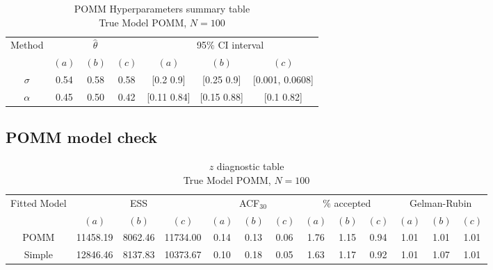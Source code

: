 \documentclass[11pt]{amsart}
\begin{document}
\begin{table}[htbp]
\centering
\caption*{
{\large POMM Hyperparameters summary table} \\ 
{\small True Model POMM, $N=100$}
} 
\begin{tabular}{ccccccc}
\toprule
\multirow{2}{*}{Method} & \multicolumn{3}{c}{
$\hat{\theta}$} & \multicolumn{3}{c}{
95$\%$ CI interval}  \\
\cmidrule(lr){2-4} \cmidrule(lr){5-7} 
& $(a)$ & $(b)$ & $(c)$ & $(a)$ & $(b)$ & $(c)$  \\
\midrule
$\sigma$  &0.54 & 0.58 & 0.58 & [0.2	0.9] & [0.25	0.9] & [0.001,	0.0608]   \\
$\alpha$ & 0.45& 0.50& 0.42 & [0.11	0.84] & [0.15	0.88] & [0.1	0.82] \\
\bottomrule
\end{tabular}
\label{table:simulations_from_simple}
\end{table}


\subsection{POMM model check}



\begin{table}[htbp]
\centering
\caption*{
{\large $z$ diagnostic table} \\ 
{\small True Model POMM, $N=100$}
} 
\begin{tabular}{ccccccccccccc}
\toprule
\multirow{2}{*}{Fitted Model} & \multicolumn{3}{c}{ESS} & \multicolumn{3}{c}{
ACF$_{30}$} & \multicolumn{3}{c}{$\%$ accepted} & \multicolumn{3}{c}{Gelman-Rubin}\\
\cmidrule(lr){2-4} \cmidrule(lr){5-7} \cmidrule(lr){8-10} \cmidrule(lr){11-13} 
& $(a)$ & $(b)$ & $(c)$ & $(a)$ & $(b)$ & $(c)$ & $(a)$ & $(b)$ & $(c)$ & $(a)$ & $(b)$ & $(c)$ \\
\midrule
POMM &11458.19 & 8062.46 & 11734.00 & 0.14 & 0.13 & 0.06 & 1.76 & 1.15 & 0.94 & 1.01 & 1.01 & 1.01  \\
Simple &12846.46 & 8137.83 & 10373.67 & 0.10 & 0.18 & 0.05 & 1.63 & 1.17 & 0.92 & 1.01 & 1.07 & 1.01    \\
\bottomrule
\end{tabular}
\label{table:simulations_from_simple}
\end{table}
\end{document}
